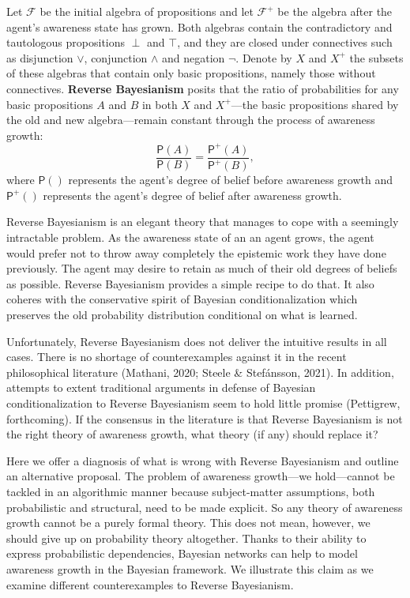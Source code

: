 \documentclass[
  11pt,
  dvipsnames,enabledeprecatedfontcommands]{scrartcl}
\newcommand{\pr}[1]{\ensuremath{\mathsf{P}(#1)}}
\newcommand{\ppr}[2]{\ensuremath{\mathsf{P}^{#1}(#2)}}
\begin{document}
Let \(\mathcal{F}\) be the initial algebra of propositions and let
\(\mathcal{F}^+\) be the algebra after the agent's awareness state has
grown. Both algebras contain the contradictory and tautologous
propositions \(\perp\) and \(\top\), and they are closed under
connectives such as disjunction \(\vee\), conjunction \(\wedge\) and
negation \(\neg\). Denote by \(X\) and \(X^+\) the subsets of these
algebras that contain only basic propositions, namely those without
connectives. \textbf{Reverse Bayesianism} posits that the ratio of
probabilities for any basic propositions \(A\) and \(B\) in both \(X\)
and \(X^+\)---the basic propositions shared by the old and new
algebra---remain constant through the process of awareness growth:
\[\frac{\pr{A}}{\pr{B}} = \frac{\ppr{+}{A}}{\ppr{+}{B}},\] where
\(\pr{}\) represents the agent's degree of belief before awareness
growth and \(\ppr{+}{}\) represents the agent's degree of belief after
awareness growth.

Reverse Bayesianism is an elegant theory that manages to cope with a
seemingly intractable problem. As the awareness state of an an agent
grows, the agent would prefer not to throw away completely the epistemic
work they have done previously. The agent may desire to retain as much
of their old degrees of beliefs as possible. Reverse Bayesianism
provides a simple recipe to do that. It also coheres with the
conservative spirit of Bayesian conditionalization which preserves the
old probability distribution conditional on what is learned.

Unfortunately, Reverse Bayesianism does not deliver the intuitive
results in all cases. There is no shortage of counterexamples against it
in the recent philosophical literature (Mathani, 2020; Steele \&
Stefánsson, 2021). In addition, attempts to extent traditional arguments
in defense of Bayesian conditionalization to Reverse Bayesianism seem to
hold little promise (Pettigrew, forthcoming). If the consensus in the
literature is that Reverse Bayesianism is not the right theory of
awareness growth, what theory (if any) should replace it?

Here we offer a diagnosis of what is wrong with Reverse Bayesianism and
outline an alternative proposal. The problem of awareness growth---we
hold---cannot be tackled in an algorithmic manner because subject-matter
assumptions, both probabilistic and structural, need to be made
explicit. So any theory of awareness growth cannot be a purely formal
theory. This does not mean, however, we should give up on probability
theory altogether. Thanks to their ability to express probabilistic
dependencies, Bayesian networks can help to model awareness growth in
the Bayesian framework. We illustrate this claim as we examine different
counterexamples to Reverse Bayesianism.
\end{document}
